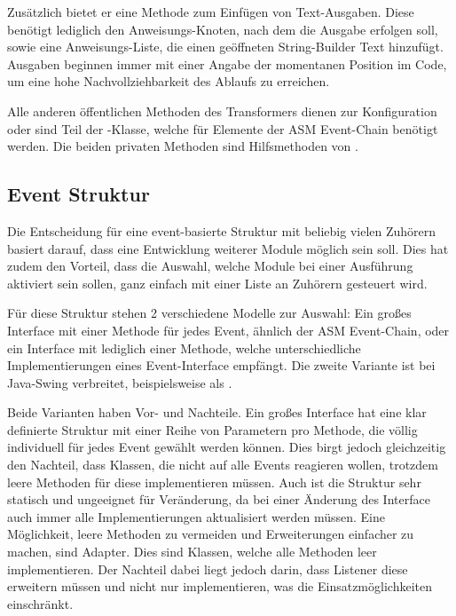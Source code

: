 Zusätzlich bietet er eine Methode zum Einfügen von Text-Ausgaben. Diese benötigt lediglich den Anweisungs-Knoten, nach dem die Ausgabe erfolgen soll, sowie eine Anweisungs-Liste, die einen geöffneten String-Builder Text hinzufügt. Ausgaben beginnen immer mit einer Angabe der momentanen Position im Code, um eine hohe Nachvollziehbarkeit des Ablaufs zu erreichen.

Alle anderen öffentlichen Methoden des Transformers dienen zur Konfiguration oder sind Teil der -Klasse, welche für Elemente der ASM Event-Chain benötigt werden. Die beiden privaten Methoden sind Hilfsmethoden von .

\subsection{Event Struktur} 

Die Entscheidung für eine event-basierte Struktur mit beliebig vielen Zuhörern basiert darauf, dass eine Entwicklung weiterer Module möglich sein soll. Dies hat zudem den Vorteil, dass die Auswahl, welche Module bei einer Ausführung aktiviert sein sollen, ganz einfach mit einer Liste an Zuhörern gesteuert wird.

Für diese Struktur stehen 2 verschiedene Modelle zur Auswahl: Ein großes Interface mit einer Methode für jedes Event, ähnlich der ASM Event-Chain, oder ein Interface mit lediglich einer Methode, welche unterschiedliche Implementierungen eines Event-Interface empfängt. Die zweite Variante ist bei Java-Swing verbreitet, beispielsweise als .

Beide Varianten haben Vor- und Nachteile.
Ein großes Interface hat eine klar definierte Struktur mit einer Reihe von Parametern pro Methode, die völlig individuell für jedes Event gewählt werden können. Dies birgt jedoch gleichzeitig den Nachteil, dass Klassen, die nicht auf alle Events reagieren wollen, trotzdem leere Methoden für diese implementieren müssen. Auch ist die Struktur sehr statisch und ungeeignet für Veränderung, da bei einer Änderung des Interface auch immer alle Implementierungen aktualisiert werden müssen. Eine Möglichkeit, leere Methoden zu vermeiden und Erweiterungen einfacher zu machen, sind Adapter. Dies sind Klassen, welche alle Methoden leer implementieren. Der Nachteil dabei liegt jedoch darin, dass Listener diese erweitern müssen und nicht nur implementieren, was die Einsatzmöglichkeiten einschränkt.

